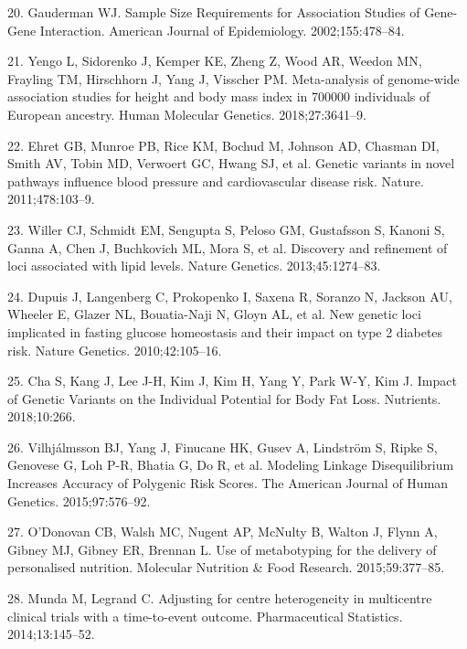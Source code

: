 \documentclass[]{article}
\begin{document}
\leavevmode\hypertarget{ref-Gauderman2002}{}%
20. Gauderman WJ. Sample Size Requirements for Association Studies of
Gene-Gene Interaction. American Journal of Epidemiology.
2002;155:478--84.

\leavevmode\hypertarget{ref-Yengo2018}{}%
21. Yengo L, Sidorenko J, Kemper KE, Zheng Z, Wood AR, Weedon MN,
Frayling TM, Hirschhorn J, Yang J, Visscher PM. Meta-analysis of
genome-wide association studies for height and body mass index in 700000
individuals of European ancestry. Human Molecular Genetics.
2018;27:3641--9.

\leavevmode\hypertarget{ref-Ehret2011}{}%
22. Ehret GB, Munroe PB, Rice KM, Bochud M, Johnson AD, Chasman DI,
Smith AV, Tobin MD, Verwoert GC, Hwang SJ, et al. Genetic variants in
novel pathways influence blood pressure and cardiovascular disease risk.
Nature. 2011;478:103--9.

\leavevmode\hypertarget{ref-Willer2013}{}%
23. Willer CJ, Schmidt EM, Sengupta S, Peloso GM, Gustafsson S, Kanoni
S, Ganna A, Chen J, Buchkovich ML, Mora S, et al. Discovery and
refinement of loci associated with lipid levels. Nature Genetics.
2013;45:1274--83.

\leavevmode\hypertarget{ref-Dupuis2010}{}%
24. Dupuis J, Langenberg C, Prokopenko I, Saxena R, Soranzo N, Jackson
AU, Wheeler E, Glazer NL, Bouatia-Naji N, Gloyn AL, et al. New genetic
loci implicated in fasting glucose homeostasis and their impact on type
2 diabetes risk. Nature Genetics. 2010;42:105--16.

\leavevmode\hypertarget{ref-Cha2018}{}%
25. Cha S, Kang J, Lee J-H, Kim J, Kim H, Yang Y, Park W-Y, Kim J.
Impact of Genetic Variants on the Individual Potential for Body Fat
Loss. Nutrients. 2018;10:266.

\leavevmode\hypertarget{ref-Vilhjalmsson2015}{}%
26. Vilhjálmsson BJ, Yang J, Finucane HK, Gusev A, Lindström S, Ripke S,
Genovese G, Loh P-R, Bhatia G, Do R, et al. Modeling Linkage
Disequilibrium Increases Accuracy of Polygenic Risk Scores. The American
Journal of Human Genetics. 2015;97:576--92.

\leavevmode\hypertarget{ref-ODonovan2015}{}%
27. O'Donovan CB, Walsh MC, Nugent AP, McNulty B, Walton J, Flynn A,
Gibney MJ, Gibney ER, Brennan L. Use of metabotyping for the delivery of
personalised nutrition. Molecular Nutrition \& Food Research.
2015;59:377--85.

\leavevmode\hypertarget{ref-Munda2014}{}%
28. Munda M, Legrand C. Adjusting for centre heterogeneity in
multicentre clinical trials with a time-to-event outcome. Pharmaceutical
Statistics. 2014;13:145--52.
\end{document}
